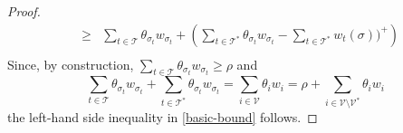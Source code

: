 \documentclass[10pt,a4paper]{amsart}
\newcommand{\mc}{\mathcal}
\newcommand{\threabs}{\theta}
\begin{document}
\begin{proof}
$$\begin{array}{rcl}
&\geq&\sum\limits_{t\in\mc T}\threabs_{\sigma_{t}}w_{\sigma_{t}}+\left(\sum\limits_{t\in\mc T^*}\threabs_{\sigma_t}w_{\sigma_t}- \sum\limits_{t\in\mc T^*}w_t(\sigma))^+\right)\\ 
\end{array}$$
Since, by construction, $\sum\limits_{t\in\mc T}\threabs_{\sigma_{t}}w_{\sigma_{t}}\geq \rho$ and 
$$\sum\limits_{t\in\mc T}\threabs_{\sigma_{t}}w_{\sigma_{t}}+\sum\limits_{t\in\mc T^*}\threabs_{\sigma_t}w_{\sigma_t}=\sum\limits_{i\in\mc V}\threabs_iw_i=\rho+\sum\limits_{i\in\mc V\setminus \mc V^*}\threabs_iw_i$$
the left-hand side inequality in \eqref{basic-bound} follows.
\end{proof}
\end{document}
